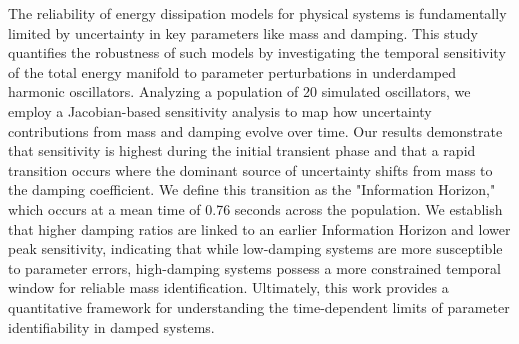 \documentclass[]{article}
\begin{document}
The reliability of energy dissipation models for physical systems is fundamentally limited by uncertainty in key parameters like mass and damping. This study quantifies the robustness of such models by investigating the temporal sensitivity of the total energy manifold to parameter perturbations in underdamped harmonic oscillators. Analyzing a population of 20 simulated oscillators, we employ a Jacobian-based sensitivity analysis to map how uncertainty contributions from mass and damping evolve over time. Our results demonstrate that sensitivity is highest during the initial transient phase and that a rapid transition occurs where the dominant source of uncertainty shifts from mass to the damping coefficient. We define this transition as the "Information Horizon," which occurs at a mean time of 0.76 seconds across the population. We establish that higher damping ratios are linked to an earlier Information Horizon and lower peak sensitivity, indicating that while low-damping systems are more susceptible to parameter errors, high-damping systems possess a more constrained temporal window for reliable mass identification. Ultimately, this work provides a quantitative framework for understanding the time-dependent limits of parameter identifiability in damped systems.
\end{document}
